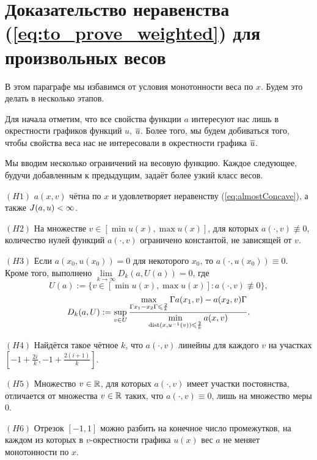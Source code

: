 \section{Доказательство неравенства (\ref{eq:to_prove_weighted}) для произвольных весов}

В этом параграфе мы избавимся от условия монотонности веса по $x$.
Будем это делать в несколько этапов.

Для начала отметим, что все свойства функции $a$ интересуют нас лишь в окрестности графиков функций $u$, $\mon{u}$.
Более того, мы будем добиваться того, чтобы свойства веса нас не интересовали в окрестности графика $\mon{u}$.

Мы вводим несколько ограничений на весовую функцию.
Каждое следующее, будучи добавленным к предыдущим, задаёт более узкий класс весов. 

\bigskip

\smallskip
\noindent
$(H1)$ $a(x, v)$ чётна по $x$ и удовлетворяет неравенству (\ref{eq:almostConcave}), а также $J(a, u) < \infty$.
\smallskip

\bigskip
\noindent
$(H2)$ На множестве $v \in [\min u(x), \max u(x)]$, для которых $a(\cdot, v) \not\equiv 0$,
количество нулей функций $a(\cdot, v)$ ограничено константой, не зависящей от $v$.

\bigskip
\noindent
$(H3)$ Если $a(x_0, u(x_0)) = 0$ для некоторого $x_0$, то $a(\cdot, u(x_0)) \equiv 0$.
Кроме того, выполнено $\lim\limits_{k \to \infty} D_k(a, U(a)) = 0$, где
$$
U(a) := \{ v \in [\min u(x), \max u(x)]: a(\cdot, v) \not \equiv 0 \},
$$
\begin{equation}
\label{eq:wgen_bigD}
D_k(a, U) := \sup \limits_{v \in U}
\frac{\max \limits_{\abs{x_1 - x_2} \le \frac{2}{k}} \abs{a(x_1, v) - a(x_2, v)}}
{\min \limits_{\dist (x, u^{-1} (v)) \le \frac{2}{k}} a(x, v)}.
\end{equation}

\bigskip
\noindent
$(H4)$ Найдётся такое чётное $k$, что $a(\cdot, v)$ линейны для каждого $v$ на участках
$[-1 + \frac{2i}{k}, -1 + \frac{2(i + 1)}{k}]$.

\bigskip
\noindent
$(H5)$ Множество $v \in \mathbb R$, для которых $a(\cdot, v)$ имеет участки постоянства,
отличается от множества $v \in \mathbb R$ таких, что $a(\cdot, v) \equiv 0$,
лишь на множество меры $0$.

\bigskip
\noindent
$(H6)$ Отрезок $[-1, 1]$ можно разбить на конечное число промежутков,
на каждом из которых в $v$-окрестности графика $u(x)$ вес $a$ не меняет монотонности по $x$.

